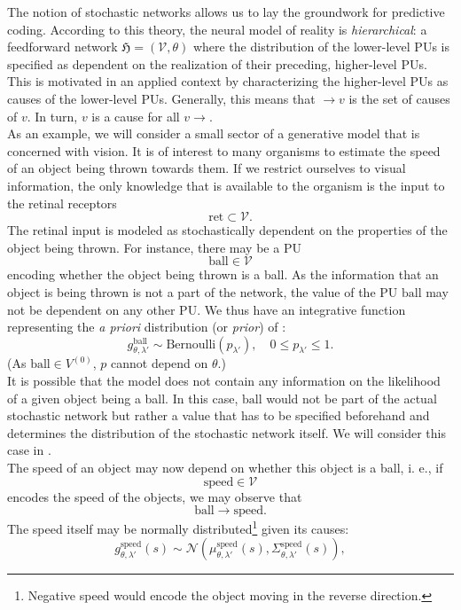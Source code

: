 \documentclass[a4paper,11pt]{report}
\begin{document}
\begin{Par}\label{predicode-1}
The notion of stochastic networks allows us to lay the groundwork for predictive coding. According to this theory, the neural model of reality is \emph{hierarchical}: a feedforward network $\mathfrak{H}=(\mathcal{V},\theta)$ where the distribution of the lower-level PUs is specified as dependent on the realization of their preceding, higher-level PUs. This is motivated in an applied context by characterizing the higher-level PUs as causes of the lower-level PUs. Generally, this means that $\to v$ is the set of causes of $v$. In turn, $v$ is a cause for all $v\to$.\\
As an example, we will consider a small sector of a generative model that is concerned with vision. It is of interest to many organisms to estimate the speed of an object being thrown towards them. If we restrict ourselves to visual information, the only knowledge that is available to the organism is the input to the retinal receptors
\[
\text{ret}\subset\mathcal{V}.
\]
The retinal input is modeled as stochastically dependent on the properties of the object being thrown. For instance, there may be a PU
\[
\text{ball}\in\mathcal{V}
\]
encoding whether the object being thrown is a ball. As the information that an object is being thrown is not a part of the network, the value of the PU $\text{ball}$ may not be dependent on any other PU. We thus have an integrative function representing the \emph{a priori} distribution (or \emph{prior}) of :
\[
g^{\text{ball}}_{\theta,\lambda'}\sim\text{Bernoulli}(p_{\lambda'}),
\quad
0\le p_{\lambda'}\le 1.
\]
(As $\text{ball}\in V^{(0)}$, $p$ cannot depend on $\theta$.)\\
It is possible that the model does not contain any information on the likelihood of a given object being a ball. In this case, $\text{ball}$ would not be part of the actual stochastic network but rather a value that has to be specified beforehand and determines the distribution of the stochastic network itself. We will consider this case in .\\
The speed of an object may now depend on whether this object is a ball, i. e., if
\[
\text{speed}\in\mathcal{V}
\]
encodes the speed of the objects, we may observe that 
\[
\text{ball}\to\text{speed}.
\]
The speed itself may be normally distributed\footnote{
Negative speed would encode the object moving in the reverse direction.} given its causes:
\[
g^{\text{speed}}_{\theta,\lambda'}(s)\sim\mathcal{N}\left(\mu^{\text{speed}}_{\theta,\lambda'}(s),\Sigma^{\text{speed}}_{\theta,\lambda'}(s)\right),
\]
\end{Par}
\end{document}
